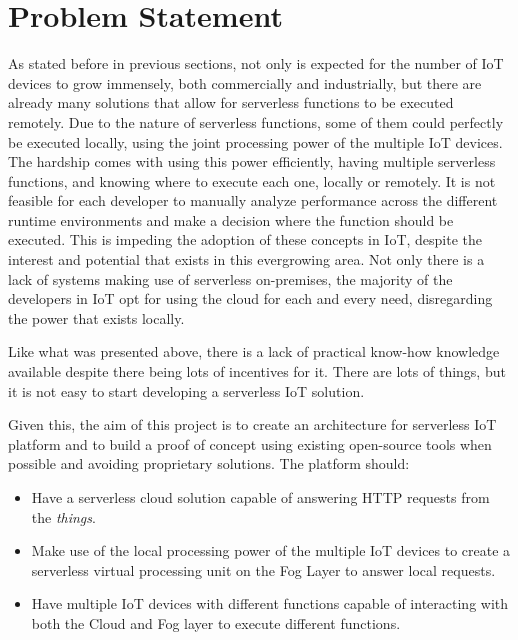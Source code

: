 \section{Problem Statement}

As stated before in previous sections, not only is expected for the number of IoT
devices to grow immensely, both commercially and industrially, but there are
already many solutions that allow for serverless functions to be executed
remotely. Due to the nature of serverless functions, some of them could perfectly
be executed locally, using the joint processing power of the multiple IoT devices.
The hardship comes with using this power efficiently, having multiple serverless
functions, and knowing where to execute each one, locally or remotely. It is not
feasible for each developer to manually analyze performance across the different
runtime environments and make a decision where the function should be executed.
This is impeding the adoption of these concepts in IoT, despite the interest and
potential that exists in this evergrowing area. Not only there is a lack of
systems making use of serverless on-premises, the majority of the developers in
IoT opt for using the cloud for each and every need, disregarding the power that
exists locally.

Like what was presented above, there is a lack of practical know-how knowledge
available despite there being lots of incentives for it. There are lots of things,
but it is not easy to start developing a serverless IoT solution.

Given this, the aim of this project is to create an architecture for serverless IoT
platform and to build a proof of concept using existing open-source tools when
possible and avoiding proprietary solutions. The platform should:
\begin{itemize}
    \item Have a serverless cloud solution capable of answering HTTP requests from
        the \textit{things}.
    \item Make use of the local processing power of the multiple IoT devices to
        create a serverless virtual processing unit on the Fog Layer to answer local requests.
    \item Have multiple IoT devices with different functions capable of
        interacting with both the Cloud and Fog layer to execute different functions. 
\end{itemize}


